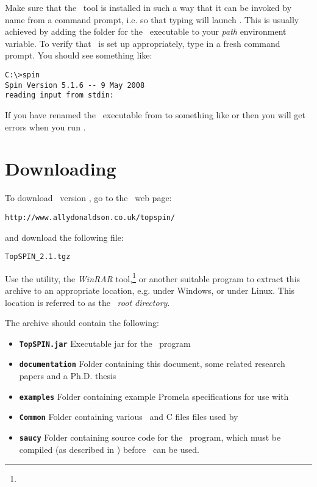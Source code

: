 \vspace{2mm}
%
 Make sure that the \spin\ tool is
installed in such a way that it can be invoked by name from a
command prompt, i.e. so that typing  will launch \spin.
This is usually achieved by adding the folder for the \spin\ executable
to your \emph{path} environment variable.
To verify that \spin\ is set up appropriately, type  in
a fresh command prompt.  You should see something like:
%
\begin{lstlisting}
C:\>spin
Spin Version 5.1.6 -- 9 May 2008
reading input from stdin:
\end{lstlisting}
%
If you have renamed the \spin\ executable from  to
something like  or  then you will
get errors when you run \topspin.
%
\section{Downloading}\label{sec:downloadandinstall:downloading}

To download \topspin\ version \topspinversion, go to the \topspin\
web page:
%
\begin{lstlisting}
http://www.allydonaldson.co.uk/topspin/
\end{lstlisting}
%
and download the following file:
%
\begin{lstlisting}
TopSPIN_2.1.tgz
\end{lstlisting}
%
Use the  utility, the \emph{WinRAR}
tool,\footnote{\texttt{\winrarwebsite}} or another suitable program
to extract this archive to an appropriate location, e.g.
 under Windows, or
 under Linux.  This location is
referred to as the \topspin\ \emph{root directory}.

The archive should contain the following:

\begin{itemize}
\item {\bf \texttt{TopSPIN.jar} } Executable jar for the \topspin\ program
\item {\bf \texttt{documentation} } Folder containing this document, some related research papers
and a Ph.D. thesis
\item {\bf \texttt{examples} } Folder containing example Promela specifications for use with \topspin
\item {\bf \texttt{Common} } Folder containing various \gap\ and C files files used by \topspin
\item {\bf \texttt{saucy} } Folder containing source code for the \saucy\ program, which must be
compiled (as described in
) before
\topspin\ can be used.
\end{itemize}

